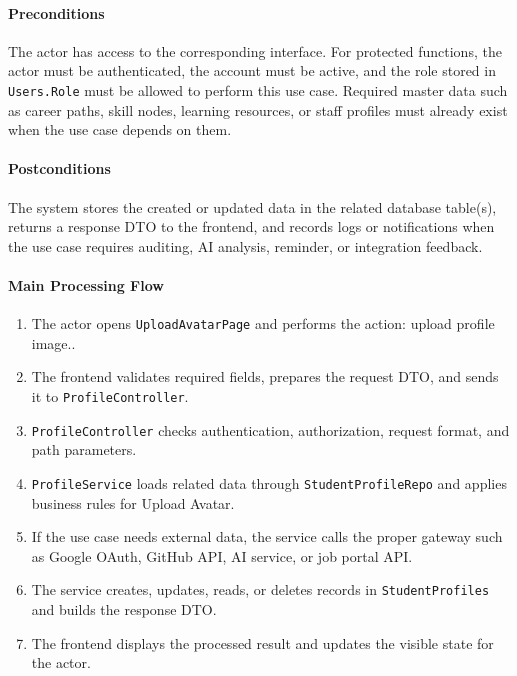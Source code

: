 \paragraph{Preconditions}

The actor has access to the corresponding interface. For protected functions, the actor must be authenticated, the account must be active, and the role stored in \texttt{Users.Role} must be allowed to perform this use case. Required master data such as career paths, skill nodes, learning resources, or staff profiles must already exist when the use case depends on them.

\paragraph{Postconditions}

The system stores the created or updated data in the related database table(s), returns a response DTO to the frontend, and records logs or notifications when the use case requires auditing, AI analysis, reminder, or integration feedback.

\paragraph{Main Processing Flow}

\begin{enumerate}
    \item The actor opens \texttt{UploadAvatarPage} and performs the action: upload profile image..
    \item The frontend validates required fields, prepares the request DTO, and sends it to \texttt{ProfileController}.
    \item \texttt{ProfileController} checks authentication, authorization, request format, and path parameters.
    \item \texttt{ProfileService} loads related data through \texttt{StudentProfileRepo} and applies business rules for Upload Avatar.
    \item If the use case needs external data, the service calls the proper gateway such as Google OAuth, GitHub API, AI service, or job portal API.
    \item The service creates, updates, reads, or deletes records in \texttt{StudentProfiles} and builds the response DTO.
    \item The frontend displays the processed result and updates the visible state for the actor.
\end{enumerate}

